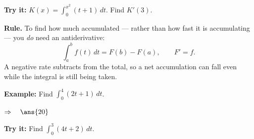 \documentclass[12pt]{article}
\begin{document}
\begin{tryitbox}
\textbf{Try it:} \quad $\displaystyle K(x) = \int_0^{x^2}(t + 1)\,dt$. Find $K'(3)$.\\[2pt]
\end{tryitbox}


\begin{formulabox}
\textbf{Rule.} To find how much accumulated --- rather than how fast it is
accumulating --- you \emph{do} need an antiderivative:
\[ \int_a^b f(t)\,dt = F(b) - F(a), \qquad F' = f. \]
A negative rate subtracts from the total, so a net accumulation can fall even
while the integral is still being taken.
\end{formulabox}

\begin{examplebox}
\textbf{Example:} \quad Find $\displaystyle \int_0^4 (2t + 1)\,dt$.

$\Rightarrow\quad \ans{20}$
\end{examplebox}

\begin{tryitbox}
\textbf{Try it:} \quad Find $\displaystyle \int_0^3 (4t + 2)\,dt$.\\[2pt]
\end{tryitbox}
\end{document}
